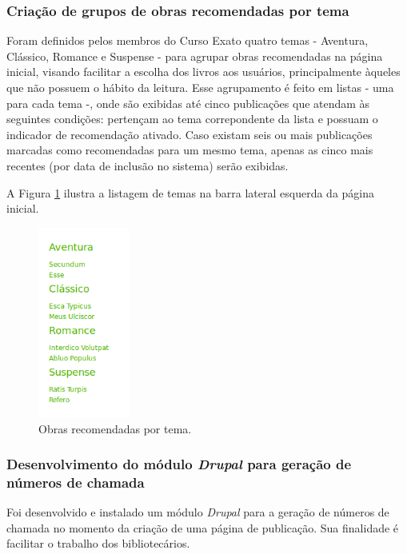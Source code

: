 \documentclass[a4paper]{article}
\begin{document}
\subsubsection{Criação de grupos de obras recomendadas por tema}\label{sssec:srecommended}
Foram definidos pelos membros do Curso Exato quatro temas - Aventura, Clássico, Romance e Suspense - para agrupar obras recomendadas na página inicial, visando facilitar a escolha dos livros aos usuários, principalmente àqueles que não possuem o hábito da leitura. Esse agrupamento é feito em listas - uma para cada tema -, onde são exibidas até cinco publicações que atendam às seguintes condições: pertençam ao tema correpondente da lista e possuam o indicador de recomendação ativado. Caso existam seis ou mais publicações marcadas como recomendadas para um mesmo tema, apenas as cinco mais recentes (por data de inclusão no sistema) serão exibidas.

A Figura \ref{recommended} ilustra a listagem de temas na barra lateral esquerda da página inicial.

\begin{figure}[pbth!]
\centering
\includegraphics[width=30mm]{img/leftsidebar-close.png}
\caption{Obras recomendadas por tema.\label{recommended}}
\end{figure}

\subsubsection{Desenvolvimento do módulo \textit{Drupal} para geração de números de chamada}\label{sssec:chamada}

Foi desenvolvido e instalado um módulo \textit{Drupal} para a geração de números de chamada no momento da criação de uma página de publicação. Sua finalidade é facilitar o trabalho dos bibliotecários.
\end{document}
